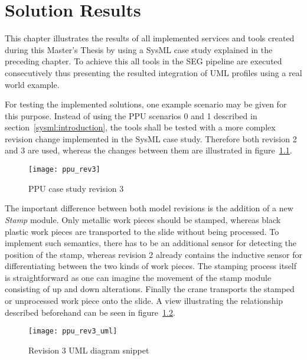 \chapter{Solution Results}\label{solution}
This chapter illustrates the results of all implemented services and tools
created during this Master's Thesis by using a \ac{SysML} case study explained
in the preceding chapter. To achieve this all tools in the \ac{SEG}
pipeline are executed consecutively thus presenting the resulted integration of
\ac{UML} profiles using a real world example.

For testing the implemented solutions, one example scenario may be given
for this purpose.
Instead of using the \ac{PPU} scenarios 0 and 1 described in section~\ref{sysml:introduction}, the tools shall be tested with a more complex
revision change implemented in the \ac{SysML} case study.
Therefore both revision 2 and 3 are used, whereas the changes between them are
illustrated in figure~\ref{ppu_rev3}.

\begin{figure}[h!]
\begin{center}
\texttt{[image: ppu\_rev3]}\\
\end{center}
\caption{\ac{PPU} case study revision 3~\cite{aiscasestudy}}
\label{ppu_rev3}
\end{figure}

The important difference between both model revisions is the addition of a new
\textit{Stamp} module. Only metallic work pieces should be stamped, whereas
black plastic work pieces are transported to the slide without being processed. To implement such
semantics, there has to be an additional sensor for detecting the position of
the stamp, whereas revision 2 already contains the inductive sensor for
differentiating between the two kinds of work pieces. The stamping process
itself is straightforward as one can imagine the movement of the stamp module
consisting of up and down alterations. Finally the crane transports the stamped
or unprocessed work piece onto the slide. A view illustrating the relationship
described beforehand can be seen in figure~\ref{ppu_rev3_uml}.

\begin{figure}[h!]
\begin{center}
\texttt{[image: ppu\_rev3\_uml]}\\
\end{center}
\caption{Revision 3 \ac{UML} diagram snippet}
\label{ppu_rev3_uml}
\end{figure}

